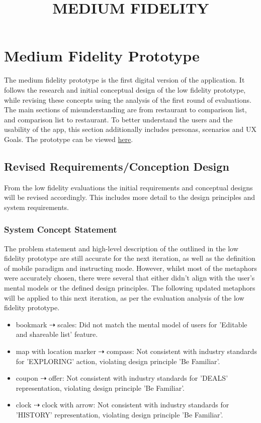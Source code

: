 \documentclass[a4 paper, 12pt]{article}
\title{MEDIUM FIDELITY}
\begin{document}
\section{Medium Fidelity Prototype}
The medium fidelity prototype is the first digital version of the application. It follows the research and initial conceptual design of the low fidelity prototype, while revising these concepts using the analysis of the first round of evaluations. The main sections of misunderstanding are from restaurant to comparison list, and comparison list to restaurant. To better understand the users and the usability of the app, this section additionally includes personas, scenarios and UX Goals. The prototype can be viewed \href{https://www.figma.com/proto/0WYtAGvFm8aOhxSIDqGJ4R/Medium-Fidelity?node-id=4%3A3&scaling=scale-down}{here}.

    \subsection{Revised Requirements/Conception Design}
    From the low fidelity evaluations the initial requirements and conceptual designs will be revised accordingly. This includes more detail to the design principles and system requirements. 

    \subsubsection*{System Concept Statement}
    The problem statement and high-level description of the outlined in the low fidelity prototype are still accurate for the next iteration, as well as the definition of mobile paradigm and instructing mode. However, whilst most of the metaphors were accurately chosen, there were several that either didn't align with the user's mental models or the defined design principles. The following updated metaphors will be applied to this next iteration, as per the evaluation analysis of the low fidelity prototype.
        \begin{itemize}
            \item bookmark $\dashrightarrow$ scales: Did not match the mental model of users for 'Editable and shareable list' feature.
            \item map with location marker $\dashrightarrow$ compass: Not consistent with industry standards for 'EXPLORING' action, violating design principle 'Be Familiar'.             
            \item coupon $\dashrightarrow$ offer: Not consistent with industry standards for 'DEALS' representation, violating design principle 'Be Familiar'. 
            \item clock $\dashrightarrow$ clock with arrow: Not consistent with industry standards for 'HISTORY' representation, violating design principle 'Be Familiar'. 
        \end{itemize}
\end{document}
